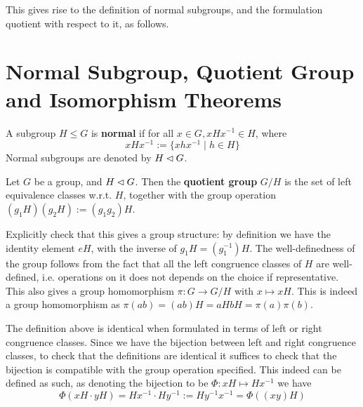\documentclass{article}
\begin{document}
This gives rise to the definition of normal subgroups, and the formulation quotient with respect to it, as follows.

\section{Normal Subgroup, Quotient Group and Isomorphism Theorems}

\begin{definition}
    A subgroup $H \leq G$ is \textbf{normal} if for all $x \in G, xHx^{-1} \in H$, where
    \[
        xHx^{-1} := \{ xhx^{-1} \mid h \in H \}
    \]
    Normal subgroups are denoted by $H \lhd G$.
\end{definition}

\begin{definition}
    Let $G$ be a group, and $H \lhd G$. Then the \textbf{quotient group} $G/H$ is the set of left equivalence classes w.r.t. $H$, together with the group operation $(g_1 H)(g_2 H) := (g_1 g_2) H$.
\end{definition}

\begin{remark}\label{rmk: projection to quotient}
    Explicitly check that this gives a group structure: by definition we have the identity element $eH$, with the inverse of $g_1 H = (g_1^{-1})H$. The well-definedness of the group follows from the fact that all the left congruence classes of $H$ are well-defined, i.e. operations on it does not depends on the choice if representative. This also gives a group homomorphism $\pi: G \to G/H$ with $x \mapsto xH$. This is indeed a group homomorphism as $\pi(ab) = (ab) H = aH bH = \pi(a) \pi(b)$. 
\end{remark}
    
\begin{remark}
    The definition above is identical when formulated in terms of left or right congruence classes. Since we have the bijection between left and right congruence classes, to check that the definitions are identical it suffices to check that the bijection is compatible with the group operation specified. This indeed can be defined as such, as denoting the bijection to be $\Phi: xH \mapsto Hx^{-1}$ we have
    \[
        \Phi(xH \cdot yH) = Hx^{-1} \cdot Hy^{-1} := H y^{-1} x^{-1} = \Phi((xy) H)
    \]
\end{remark}
\end{document}
